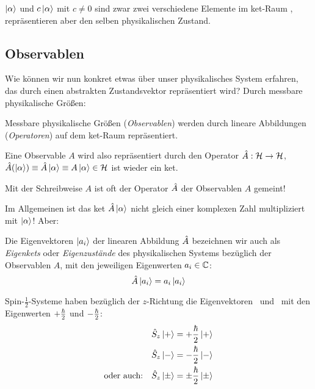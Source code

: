 \begin{post}
 $\ket{\alpha}$ und $c \ket{\alpha}$ mit $c \neq 0$ sind zwar zwei verschiedene Elemente im ket-Raum \hs, repr\"asentieren aber den selben physikalischen Zustand.
\end{post}

\subsection{Observablen}
Wie k\"onnen wir nun konkret etwas \"uber unser physikalisches System erfahren, das durch einen abstrakten Zustandsvektor repr\"asentiert wird? Durch messbare physikalische Gr\"o\ss{}en:

\begin{post}
 Messbare physikalische Gr\"o\ss{}en (\emph{Observablen}) werden durch lineare Abbildungen (\emph{Operatoren}) auf dem ket-Raum repr\"asentiert.
\end{post}
Eine Observable $A$ wird also repr\"asentiert durch den Operator $\hat{A}: \mathcal{H} \rightarrow \mathcal{H}$, $\hat{A}( \ket{\alpha}) \equiv \hat{A} \ket{\alpha} \equiv A \ket{\alpha} \in \mathcal{H}$ ist wieder ein ket.
\begin{konv}
 Mit der Schreibweise $A$ ist oft der Operator $\hat{A}$ der Observablen $A$ gemeint!
\end{konv}
Im Allgemeinen ist das ket $\hat{A} \ket{\alpha}$ nicht gleich einer komplexen Zahl multipliziert mit $\ket{\alpha}$! Aber:
\begin{defn}
Die Eigenvektoren $\ket{a_i}$ der linearen Abbildung $\hat{A}$ bezeichnen wir auch als \emph{Eigenkets} oder \emph{Eigenzust\"ande} des physikalischen Systems bez\"uglich der Observablen $A$, mit den jeweiligen Eigenwerten $a_i \in \mathbb{C}$:
\begin{equation*}
 \hat{A} \ket{a_i} = a_i \ket{a_i}
\end{equation*}
\end{defn}

\begin{bsp}
 Spin-$\frac{1}{2}$-Systeme haben bez\"uglich der $z$-Richtung die Eigenvektoren \szus\ und \szds\ mit den Eigenwerten $+\frac{\hbar}{2}$ und $-\frac{\hbar}{2}$:
 \begin{align*}
  \hat{S}_z \ket{+} &= + \frac{\hbar}{2} \ket{+} \\
  \hat{S}_z \ket{-} &= - \frac{\hbar}{2} \ket{-} \\
  \text{oder auch:} \quad \hat{S}_z \ket{\pm} &= \pm \frac{\hbar}{2} \ket{\pm}
 \end{align*}

\end{bsp}

